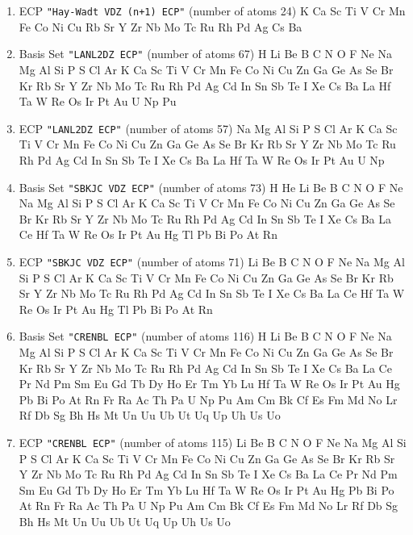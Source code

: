 \begin{enumerate}
\item ECP \verb#"Hay-Wadt VDZ (n+1) ECP"# (number of atoms 24)  \newline 
  K Ca Sc Ti V Cr Mn Fe Co Ni Cu Rb Sr Y Zr Nb Mo Tc Ru Rh Pd Ag Cs Ba


\item Basis Set \verb#"LANL2DZ ECP"# (number of atoms 67)  \newline 
  H Li Be B C N O F Ne Na Mg Al Si P S Cl Ar K Ca Sc Ti V Cr Mn Fe
 Co Ni Cu Zn Ga Ge As Se Br Kr Rb Sr Y Zr Nb Mo Tc Ru Rh Pd Ag Cd In Sn Sb
 Te I Xe Cs Ba La Hf Ta W Re Os Ir Pt Au U Np Pu


\item ECP \verb#"LANL2DZ ECP"# (number of atoms 57)  \newline 
  Na Mg Al Si P S Cl Ar K Ca Sc Ti V Cr Mn Fe Co Ni Cu Zn Ga Ge As Se Br
 Kr Rb Sr Y Zr Nb Mo Tc Ru Rh Pd Ag Cd In Sn Sb Te I Xe Cs Ba La Hf Ta W
 Re Os Ir Pt Au U Np


\item Basis Set \verb#"SBKJC VDZ ECP"# (number of atoms 73)  \newline 
  H He Li Be B C N O F Ne Na Mg Al Si P S Cl Ar K Ca Sc Ti V Cr Mn
 Fe Co Ni Cu Zn Ga Ge As Se Br Kr Rb Sr Y Zr Nb Mo Tc Ru Rh Pd Ag Cd In Sn
 Sb Te I Xe Cs Ba La Ce Hf Ta W Re Os Ir Pt Au Hg Tl Pb Bi Po At Rn


\item ECP \verb#"SBKJC VDZ ECP"# (number of atoms 71)  \newline 
  Li Be B C N O F Ne Na Mg Al Si P S Cl Ar K Ca Sc Ti V Cr Mn Fe Co
 Ni Cu Zn Ga Ge As Se Br Kr Rb Sr Y Zr Nb Mo Tc Ru Rh Pd Ag Cd In Sn Sb Te
 I Xe Cs Ba La Ce Hf Ta W Re Os Ir Pt Au Hg Tl Pb Bi Po At Rn


\item Basis Set \verb#"CRENBL ECP"# (number of atoms 116)  \newline 
  H Li Be B C N O F Ne Na Mg Al Si P S Cl Ar K Ca Sc Ti V Cr Mn Fe
 Co Ni Cu Zn Ga Ge As Se Br Kr Rb Sr Y Zr Nb Mo Tc Ru Rh Pd Ag Cd In Sn Sb
 Te I Xe Cs Ba La Ce Pr Nd Pm Sm Eu Gd Tb Dy Ho Er Tm Yb Lu Hf Ta W Re Os
 Ir Pt Au Hg Pb Bi Po At Rn Fr Ra Ac Th Pa U Np Pu Am Cm Bk Cf Es Fm Md No
 Lr Rf Db Sg Bh Hs Mt Un Uu Ub Ut Uq Up Uh Us Uo


\item ECP \verb#"CRENBL ECP"# (number of atoms 115)  \newline 
  Li Be B C N O F Ne Na Mg Al Si P S Cl Ar K Ca Sc Ti V Cr Mn Fe Co
 Ni Cu Zn Ga Ge As Se Br Kr Rb Sr Y Zr Nb Mo Tc Ru Rh Pd Ag Cd In Sn Sb Te
 I Xe Cs Ba La Ce Pr Nd Pm Sm Eu Gd Tb Dy Ho Er Tm Yb Lu Hf Ta W Re Os Ir
 Pt Au Hg Pb Bi Po At Rn Fr Ra Ac Th Pa U Np Pu Am Cm Bk Cf Es Fm Md No Lr
 Rf Db Sg Bh Hs Mt Un Uu Ub Ut Uq Up Uh Us Uo



\end{enumerate}
